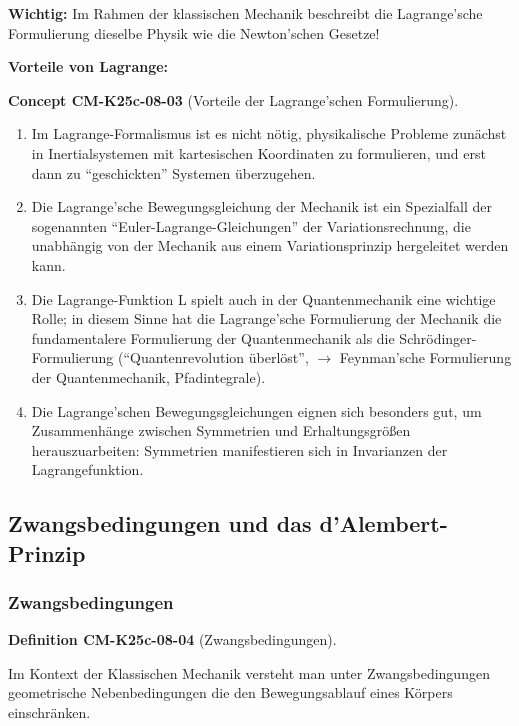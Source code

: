 \documentclass[10pt, letterpaper]{article}
\newcommand{\CustomHeading}[3]{%
  \par\medskip\noindent%
  \textbf{#1 #2} \textnormal{(#3)}.\enskip%
}
\newenvironment{DEF}[2]{\begin{unitbox}\CustomHeading{Definition}{#1}{#2}}{\end{unitbox}}
\newenvironment{CONC}[2]{\begin{unitbox}\CustomHeading{Concept}{#1}{#2}}{\end{unitbox}}
\begin{document}
\textbf{Wichtig:} Im Rahmen der klassischen Mechanik beschreibt die Lagrange'sche Formulierung dieselbe Physik wie die Newton'schen Gesetze!

\textbf{Vorteile von Lagrange:}

\begin{CONC}{CM-K25c-08-03}{Vorteile der Lagrange'schen Formulierung}
\begin{enumerate}
\item Im Lagrange-Formalismus ist es nicht nötig, physikalische Probleme zunächst in Inertialsystemen mit kartesischen Koordinaten zu formulieren, und erst dann zu ``geschickten'' Systemen überzugehen.

\item Die Lagrange'sche Bewegungsgleichung der Mechanik ist ein Spezialfall der sogenannten ``Euler-Lagrange-Gleichungen'' der Variationsrechnung, die unabhängig von der Mechanik aus einem Variationsprinzip hergeleitet werden kann.

\item Die Lagrange-Funktion L spielt auch in der Quantenmechanik eine wichtige Rolle; in diesem Sinne hat die Lagrange'sche Formulierung der Mechanik die
fundamentalere Formulierung der Quantenmechanik als die Schrödinger-Formulierung (``Quantenrevolution überlöst'', $\to$ Feynman'sche Formulierung der Quantenmechanik, Pfadintegrale).

\item Die Lagrange'schen Bewegungsgleichungen eignen sich besonders gut, um Zusammenhänge zwischen Symmetrien und Erhaltungsgrößen herauszuarbeiten: Symmetrien manifestieren sich in Invarianzen der Lagrangefunktion.
\end{enumerate}
\end{CONC}


\subsection{Zwangsbedingungen und das d'Alembert-Prinzip}

\subsubsection{Zwangsbedingungen}



\begin{DEF}{CM-K25c-08-04}{Zwangsbedingungen}
Im Kontext der Klassischen Mechanik versteht man unter Zwangsbedingungen geometrische Nebenbedingungen die den Bewegungsablauf eines Körpers einschränken.
\end{DEF}
\end{document}
